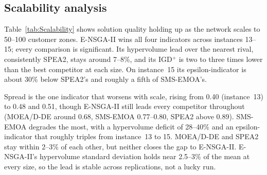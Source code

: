 \documentclass[11pt, a4paper]{article}
\begin{document}
\hypertarget{scalability-analysis}{%
\subsection{Scalability analysis}\label{scalability-analysis}}
Table~\ref{tab:Scalability} shows solution quality holding up as the network scales to 50--100 customer zones. E-NSGA-II wins all four indicators across instances 13--15; every comparison is significant. Its hypervolume lead over the nearest rival, consistently SPEA2, stays around 7--8\%, and its IGD$^+$ is two to three times lower than the best competitor at each size. On instance~15 its epsilon-indicator is about 30\% below SPEA2's and roughly a fifth of SMS-EMOA's.

Spread is the one indicator that worsens with scale, rising from 0.40 (instance~13) to 0.48 and 0.51, though E-NSGA-II still leads every competitor throughout (MOEA/D-DE around 0.68, SMS-EMOA 0.77--0.80, SPEA2 above 0.89). SMS-EMOA degrades the most, with a hypervolume deficit of 28--40\% and an epsilon-indicator that roughly triples from instance~13 to 15. MOEA/D-DE and SPEA2 stay within 2--3\% of each other, but neither closes the gap to E-NSGA-II. E-NSGA-II's hypervolume standard deviation holds near 2.5--3\% of the mean at every size, so the lead is stable across replications, not a lucky run.
\end{document}
